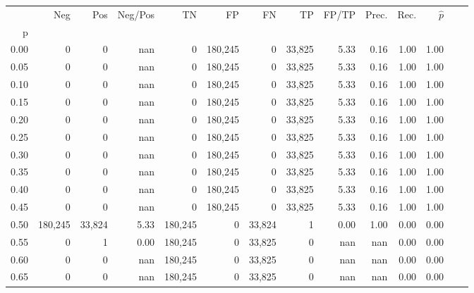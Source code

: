 \begin{tabular}{rrrrrrrrrrrrrr}
\toprule
{} &      Neg &     Pos & Neg/Pos &       TN &       FP &      FN &      TP & FP/TP & Prec. &  Rec. & $\hat{p}$ \\
p    &          &         &         &          &          &         &         &       &       &       &           \\
\midrule
0.00 &        0 &       0 &     nan &        0 &  180,245 &       0 &  33,825 &  5.33 &  0.16 &  1.00 &      1.00 \\
0.05 &        0 &       0 &     nan &        0 &  180,245 &       0 &  33,825 &  5.33 &  0.16 &  1.00 &      1.00 \\
0.10 &        0 &       0 &     nan &        0 &  180,245 &       0 &  33,825 &  5.33 &  0.16 &  1.00 &      1.00 \\
0.15 &        0 &       0 &     nan &        0 &  180,245 &       0 &  33,825 &  5.33 &  0.16 &  1.00 &      1.00 \\
0.20 &        0 &       0 &     nan &        0 &  180,245 &       0 &  33,825 &  5.33 &  0.16 &  1.00 &      1.00 \\
0.25 &        0 &       0 &     nan &        0 &  180,245 &       0 &  33,825 &  5.33 &  0.16 &  1.00 &      1.00 \\
0.30 &        0 &       0 &     nan &        0 &  180,245 &       0 &  33,825 &  5.33 &  0.16 &  1.00 &      1.00 \\
0.35 &        0 &       0 &     nan &        0 &  180,245 &       0 &  33,825 &  5.33 &  0.16 &  1.00 &      1.00 \\
0.40 &        0 &       0 &     nan &        0 &  180,245 &       0 &  33,825 &  5.33 &  0.16 &  1.00 &      1.00 \\
0.45 &        0 &       0 &     nan &        0 &  180,245 &       0 &  33,825 &  5.33 &  0.16 &  1.00 &      1.00 \\
0.50 &  180,245 &  33,824 &    5.33 &  180,245 &        0 &  33,824 &       1 &  0.00 &  1.00 &  0.00 &      0.00 \\
0.55 &        0 &       1 &    0.00 &  180,245 &        0 &  33,825 &       0 &   nan &   nan &  0.00 &      0.00 \\
0.60 &        0 &       0 &     nan &  180,245 &        0 &  33,825 &       0 &   nan &   nan &  0.00 &      0.00 \\
0.65 &        0 &       0 &     nan &  180,245 &        0 &  33,825 &       0 &   nan &   nan &  0.00 &      0.00 \\

\end{tabular}
